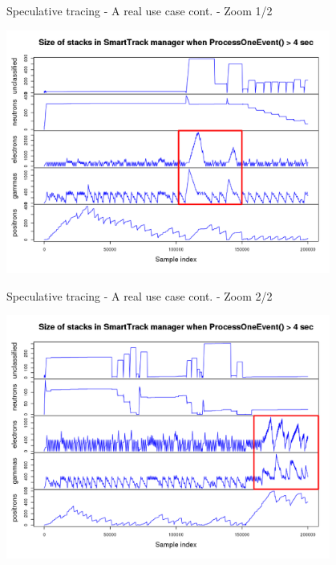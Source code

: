 \documentclass{beamer}
\begin{document}
\begin{frame}{Speculative tracing - A real use case cont. - Zoom 1/2}

\begin{center}
  \includegraphics[width=0.8\textwidth]{pathol-zoom1.png}
\end{center}
\end{frame}

\begin{frame}{Speculative tracing - A real use case cont. - Zoom 2/2}

\begin{center}
  \includegraphics[width=0.8\textwidth]{pathol-zoom2.png}
\end{center}
\end{frame}
\end{document}
